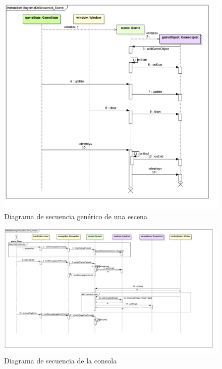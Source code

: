 \begin{figure}
	\centerline{\includegraphics[width=15cm]{otros/UML/png/alld/png/CasosDeUso__General__Collaboration2__Interaction1__diagramaDeSecuencia_Scene_16.png}}
	\caption{Diagrama de secuencia genérico de una escena}
	\label{sec:scene}
\end{figure}

\begin{landscape}
\begin{figure}
	\centerline{\includegraphics[width=20cm]{otros/UML/png/alld/png/CasosDeUso__Especifico__Collaboration4__Interaction1__diagramaDeSecuencia_consola_20.png}}
	\caption{Diagrama de secuencia de la consola}
	\label{sec:console}
\end{figure}
\end{landscape}

